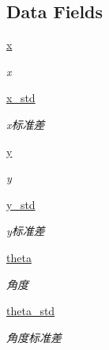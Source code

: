 \subsection*{Data Fields}
\begin{DoxyCompactItemize}
\item 
\hyperlink{classfuse___g___a_1_1_a_m_c_l__unit_a6d2392a8877caab4b503784347425857}{x}
\begin{DoxyCompactList}\small\item\em x \end{DoxyCompactList}\item 
\hyperlink{classfuse___g___a_1_1_a_m_c_l__unit_ad51b32599bf7bc89ff18ca99e1902b96}{x\+\_\+std}
\begin{DoxyCompactList}\small\item\em x标准差 \end{DoxyCompactList}\item 
\hyperlink{classfuse___g___a_1_1_a_m_c_l__unit_a9bb4b56e7593906c99ca21f37ad31b4a}{y}
\begin{DoxyCompactList}\small\item\em y \end{DoxyCompactList}\item 
\hyperlink{classfuse___g___a_1_1_a_m_c_l__unit_ab312d8f6eeaff2878757a6cdc65f84e4}{y\+\_\+std}
\begin{DoxyCompactList}\small\item\em y标准差 \end{DoxyCompactList}\item 
\hyperlink{classfuse___g___a_1_1_a_m_c_l__unit_a007f077317171562ca2e8d28a7dac183}{theta}
\begin{DoxyCompactList}\small\item\em 角度 \end{DoxyCompactList}\item 
\hyperlink{classfuse___g___a_1_1_a_m_c_l__unit_afbca137f12d799a11409122cea888b29}{theta\+\_\+std}
\begin{DoxyCompactList}\small\item\em 角度标准差 \end{DoxyCompactList}\end{DoxyCompactItemize}
